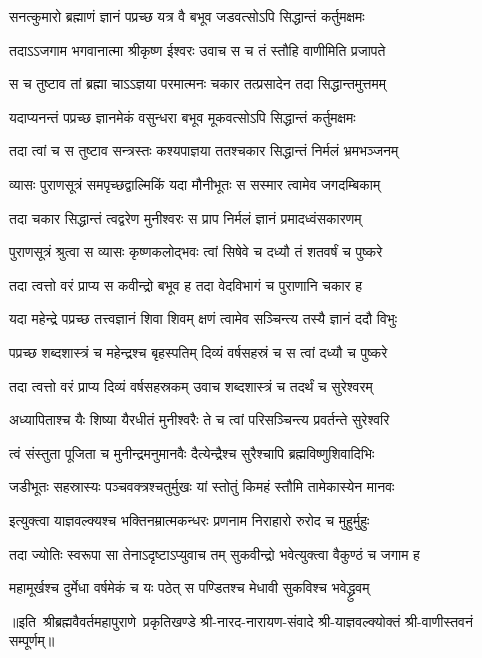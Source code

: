 \twolineshloka
{सनत्कुमारो ब्रह्माणं ज्ञानं पप्रच्छ यत्र वै}
{बभूव जडवत्सोऽपि सिद्धान्तं कर्तुमक्षमः}%

\twolineshloka
{तदाऽऽजगाम भगवानात्मा श्रीकृष्ण ईश्वरः}
{उवाच स च तं स्तौहि वाणीमिति प्रजापते}%

\twolineshloka
{स च तुष्टाव तां ब्रह्मा चाऽऽज्ञया परमात्मनः}
{चकार तत्प्रसादेन तदा सिद्धान्तमुत्तमम्}%

\twolineshloka
{यदाप्यनन्तं पप्रच्छ ज्ञानमेकं वसुन्धरा}
{बभूव मूकवत्सोऽपि सिद्धान्तं कर्तुमक्षमः}%

\twolineshloka
{तदा त्वां च स तुष्टाव सन्त्रस्तः कश्यपाज्ञया}
{ततश्चकार सिद्धान्तं निर्मलं भ्रमभञ्जनम्}%

\twolineshloka
{व्यासः पुराणसूत्रं समपृच्छद्वाल्मिकिं यदा}
{मौनीभूतः स सस्मार त्वामेव जगदम्बिकाम्}%

\twolineshloka
{तदा चकार सिद्धान्तं त्वद्वरेण मुनीश्वरः}
{स प्राप निर्मलं ज्ञानं प्रमादध्वंसकारणम्}%

\twolineshloka
{पुराणसूत्रं श्रुत्वा स व्यासः कृष्णकलोद्भवः}
{त्वां सिषेवे च दध्यौ तं शतवर्षं च पुष्करे}%

\twolineshloka
{तदा त्वत्तो वरं प्राप्य स कवीन्द्रो बभूव ह}
{तदा वेदविभागं च पुराणानि चकार ह}%

\twolineshloka
{यदा महेन्द्रे पप्रच्छ तत्त्वज्ञानं शिवा शिवम्}
{क्षणं त्वामेव सञ्चिन्त्य तस्यै ज्ञानं ददौ विभुः}%

\twolineshloka
{पप्रच्छ शब्दशास्त्रं च महेन्द्रश्च बृहस्पतिम्}
{दिव्यं वर्षसहस्रं च स त्वां दध्यौ च पुष्करे}%

\twolineshloka
{तदा त्वत्तो वरं प्राप्य दिव्यं वर्षसहस्रकम्}
{उवाच शब्दशास्त्रं च तदर्थं च सुरेश्वरम्}%

\twolineshloka
{अध्यापिताश्च यैः शिष्या यैरधीतं मुनीश्वरैः}
{ते च त्वां परिसञ्चिन्त्य प्रवर्तन्ते सुरेश्वरि}%

\twolineshloka
{त्वं संस्तुता पूजिता च मुनीन्द्रमनुमानवैः}
{दैत्येन्द्रैश्च सुरैश्चापि ब्रह्मविष्णुशिवादिभिः}%

\twolineshloka
{जडीभूतः सहस्रास्यः पञ्चवक्त्रश्चतुर्मुखः}
{यां स्तोतुं किमहं स्तौमि तामेकास्येन मानवः}%

\twolineshloka
{इत्युक्त्वा याज्ञवल्क्यश्च भक्तिनम्रात्मकन्धरः}
{प्रणनाम निराहारो रुरोद च मुहुर्मुहुः}%

\twolineshloka
{तदा ज्योतिः स्वरूपा सा तेनाऽदृष्टाऽप्युवाच तम्}
{सुकवीन्द्रो भवेत्युक्त्वा वैकुण्ठं च जगाम ह}%

\twolineshloka
{महामूर्खश्च दुर्मेधा वर्षमेकं च यः पठेत्}
{स पण्डितश्च मेधावी सुकविश्च भवेद्ध्रुवम्}%

{॥इति~श्रीब्रह्मवैवर्तमहापुराणे~प्रकृतिखण्डे श्री-नारद-नारायण-संवादे श्री-याज्ञवल्क्योक्तं श्री-वाणीस्तवनं सम्पूर्णम्॥}